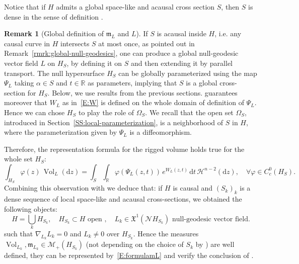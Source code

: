 \documentclass[12pt,a4paper]{amsart}
\theoremstyle{plain}
\theoremstyle{definition}
\newtheorem{remark}[lemma]{Remark}
\numberwithin{equation}{section}
\let\phi\varphi
\newcommand{\R}{\mathbb{R}}
\DeclareMathOperator{\vol}{Vol}
\newcommand{\de}{{\mathrm{d}}}
\newcommand{\haus}{\mathcal{H}}
\newcommand{\gflow}{\Psi}
\newcommand{\mm}{\mathfrak m}
\newcommand{\vfield}{\mathfrak{X}}
\newcommand{\normal}{\mathscr{N}}
\begin{document}
Notice that if $H$ admits a global  space-like and acausal cross section $S$, then $S$ is dense in the sense of definition .


\begin{remark}[Global definition of $\mm_{L}$ and $L$] \label{R:globalcross}
If $S$ is  acausal inside $H$, i.e. any causal curve
in $H$ intersects $S$ at most once,  as pointed out in
Remark~\ref{rmrk:global-null-geodesics},
one can produce a global null-geodesic vector field $L$ on $H_S$, by defining it on $S$ and then extending it by parallel transport.
%
The null hypersurface $H_S$ can be globally
parameterized using the map $\gflow_L$ taking $\alpha\in S$ and $t\in\R$ as
parameters, implying that $S$ is a global cross-section for $H_S$. 
Below, we use results from the previous sections.
  guarantees moreover that $W_{L}$ as in~\eqref{E:W} is
  defined on the whole domain of definition of $\gflow_L$.
  Hence we can chose $H_S$ to play the role of $\Omega_S$.
  We recall that the open set $\Omega_S$, introduced in
  Section~\ref{SS:local-parameterization}, is a neighborhood of $S$ in $H$, where
  the parameterization given by $\gflow_L$ is a diffeomorphism.
  
  Therefore, the representation formula for the rigged volume
  holds true for the whole set $H_S$:
  \begin{equation}\label{E:representingV}
    \int_{H_S}
    \phi(z)
    \,
    \vol_L
    (\de z)
    =
    \int_S
    \int_{\R}
    \phi(\gflow_L(z,t))
    \,
    e^{W_{L}(z,t)}
    \,
    \de t
    \,
    \haus^{n-2}(\de z)
    ,
    \quad
    \forall
    \phi
    \in
    C^{0}_c(H_S)
    .
  \end{equation}
Combining this observation with  we deduce that: if $H$ is causal and $(S_k)_k$ is a dense sequence of local space-like and acausal cross-sections, we obtained the following objects:  
%
\begin{equation}\label{E:summary}
H = \bigcup_{k} H_{S_{k}},  \quad H_{S_{k}}\subset H \textrm{ open }, \quad L_{k} \in \vfield^{1}(\normal
  H_{S_{k}}) \textrm{ null-geodesic vector field}. 
\end{equation}
%
such that $\nabla_{L_{k}}L_{k} = 0$ and $L_{k} \neq 0 $ over  $H_{S_{k}}$.  
Hence the measures $\vol_{L_{k}}, \mm_{L_{k}} \in \mathcal{M}_{+}(H_{S_{k}})$ (not depending on the choice of $S_{k}$ by ) are well defined, 
they can be represented by~\eqref{E:formulamL} and verify the conclusion of . 


\end{remark}
\end{document}
